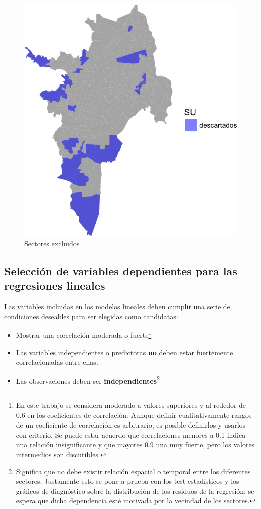 \documentclass[12pt,a4paper,openany]{book}
\providecommand{\tightlist}{%
  \setlength{\itemsep}{0pt}\setlength{\parskip}{0pt}}
\let\rmarkdownfootnote\footnote%
\def\footnote{\protect\rmarkdownfootnote}
\theoremstyle{definition}
\theoremstyle{definition}
\theoremstyle{definition}
\theoremstyle{remark}
\begin{document}
\begin{figure}[H]

{\centering \includegraphics[width=0.6\linewidth]{tesis-unigis_files/figure-latex/mapa-excluidos-1} 

}

\caption{Sectores excluidos}\label{fig:mapa-excluidos}
\end{figure}

\subsection{Selección de variables dependientes para las regresiones
lineales}\label{selecciuxf3n-de-variables-dependientes-para-las-regresiones-lineales}

Las variables incluidas en los modelos lineales deben cumplir una serie
de condiciones deseables para ser elegidas como candidatas:

\begin{itemize}
\tightlist
\item
  Mostrar una correlación moderada o fuerte\footnote{En este trabajo se
    considera moderado a valores superiores y al rededor de 0.6 en los
    coeficientes de correlación. Aunque definir cualitativamente rangos
    de un coeficiente de correlación es arbitrario, es posible
    definirlos y usarlos con criterio. Se puede estar acuerdo que
    correlaciones menores a 0.1 indica una relación insignificante y que
    mayores 0.9 una muy fuerte, pero los valores intermedios son
    discutibles.}
\item
  Las variables independientes o predictoras \textbf{no} deben estar
  fuertemente correlacionadas entre ellas.
\item
  Las observaciones deben ser \textbf{independientes}\footnote{Significa
    que no debe existir relación espacial o temporal entre los
    diferentes sectores. Justamente esto se pone a prueba con los test
    estadísticos y los gráficos de diagnóstico sobre la distribución de
    los residuos de la regresión: se espera que dicha dependencia esté
    motivada por la vecindad de los sectores.}
\end{itemize}
\end{document}
